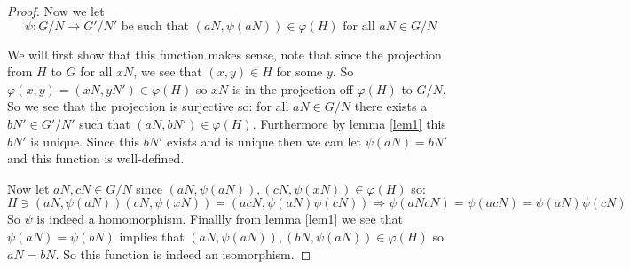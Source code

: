 \begin{exercise}
\begin{proof}
        Now we let \begin{equation*}
            \psi\colon G/N \rightarrow G'/N' \text{ be such that } (aN, \psi(aN)) \in \varphi(H) \text{ for all }aN\in G/N
        \end{equation*}

        We will first show that this function makes sense, note that since the projection from $H$ to $G$ for all $xN$, we see that $(x,y)\in H$ for some $y$. So $\varphi(x,y) = (xN,yN')\in \varphi(H)$ so $xN$ is in the projection off $\varphi(H)$ to $G/N$. So we see that the projection is surjective so: 
        for all $aN\in G/N$ there exists a $bN'\in G'/N'$ such that $(aN,bN')\in \varphi(H)$. Furthermore by lemma \ref{lem1} this $bN'$ is unique. Since this $bN'$ exists and is unique then we can let $\psi(aN) = bN'$ and this function is well-defined.

        Now let $aN,cN\in G/N$ since $(aN, \psi(aN)),(cN,\psi(xN)) \in \varphi(H)$ so:\begin{equation*}
            H \ni (aN, \psi(aN))(cN,\psi(xN)) = (acN, \psi(aN)\psi(cN)) \Rightarrow \psi(aNcN) = \psi(acN) = \psi(aN)\psi(cN)
        \end{equation*} 
        So $\psi$ is indeed a homomorphism. Finallly from lemma \ref{lem1} we see that $\psi(aN) = \psi(bN)$ implies that $(aN,\psi(aN)),(bN,\psi(aN))\in \varphi(H)$ so $aN=bN$. So this function is indeed an isomorphism.
    \end{proof}
    \end{exercise}

